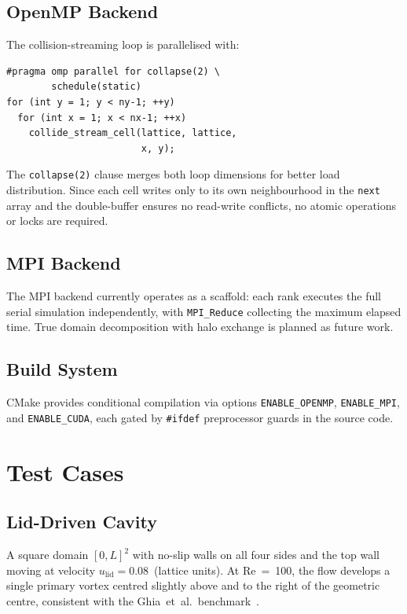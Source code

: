 \documentclass[journal]{IEEEtran}
\begin{document}
\subsection{OpenMP Backend}
The collision-streaming loop is parallelised with:
\begin{verbatim}
#pragma omp parallel for collapse(2) \
        schedule(static)
for (int y = 1; y < ny-1; ++y)
  for (int x = 1; x < nx-1; ++x)
    collide_stream_cell(lattice, lattice,
                        x, y);
\end{verbatim}
The \texttt{collapse(2)} clause merges both loop dimensions for
better load distribution.  Since each cell writes only to its own
neighbourhood in the \texttt{next} array and the double-buffer
ensures no read-write conflicts, no atomic operations or locks are
required.

\subsection{MPI Backend}
The MPI backend currently operates as a scaffold: each rank
executes the full serial simulation independently, with
\texttt{MPI\_Reduce} collecting the maximum elapsed time.  True
domain decomposition with halo exchange is planned as future work.

\subsection{Build System}
CMake provides conditional compilation via options
\texttt{ENABLE\_OPENMP}, \texttt{ENABLE\_MPI}, and
\texttt{ENABLE\_CUDA}, each gated by \texttt{\#ifdef} preprocessor
guards in the source code.

\section{Test Cases}
\label{sec:cases}

\subsection{Lid-Driven Cavity}
A square domain $[0, L]^2$ with no-slip walls on all four sides and
the top wall moving at velocity $u_{\mathrm{lid}} = 0.08$~(lattice
units).  At Re~=~100, the flow develops a single primary vortex
centred slightly above and to the right of the geometric centre,
consistent with the Ghia~et~al.\ benchmark~\cite{ghia1982}.
\end{document}
